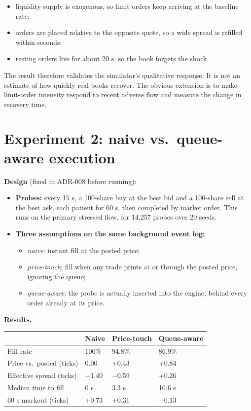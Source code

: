 \documentclass[11pt]{article}
\providecommand{\tightlist}{\setlength{\itemsep}{0pt}\setlength{\parskip}{0pt}}
\begin{document}
\begin{itemize}
\tightlist
\item
  liquidity supply is exogenous, so limit orders keep arriving at the
  baseline rate;
\item
  orders are placed relative to the opposite quote, so a wide spread is
  refilled within seconds;
\item
  resting orders live for about 20 s, so the book forgets the shock.
\end{itemize}

The result therefore validates the simulator's qualitative response. It
is not an estimate of how quickly real books recover. The obvious
extension is to make limit-order intensity respond to recent adverse
flow and measure the change in recovery time.

\hypertarget{experiment-2-naive-vs.-queue-aware-execution}{%
\section{Experiment 2: naive vs.~queue-aware execution}\label{experiment-2-naive-vs.-queue-aware-execution}}

\textbf{Design} (fixed in ADR-008 before running):

\begin{itemize}
\tightlist
\item
  \textbf{Probes:} every 15 s, a 100-share buy at the best bid and a 100-share
  sell at the best ask, each patient for 60 s, then completed by market
  order. This runs on the primary stressed flow, for 14,257 probes over
  20 seeds.
\item
  \textbf{Three assumptions on the same background event log:}

  \begin{itemize}
  \tightlist
  \item
    \emph{naive}: instant fill at the posted price;
  \item
    \emph{price-touch}: fill when any trade prints at or through the posted
    price, ignoring the queue;
  \item
    \emph{queue-aware}: the probe is actually inserted into the engine,
    behind every order already at its price.
  \end{itemize}
\end{itemize}

\textbf{Results.}

\begin{longtable}[]{@{}llll@{}}
\toprule\noalign{}
& Naive & Price-touch & Queue-aware \\
\midrule\noalign{}
\endhead
\bottomrule\noalign{}
\endlastfoot
Fill rate & 100\% & 94.8\% & 86.9\% \\
Price vs.~posted (ticks) & 0.00 & +0.43 & +0.84 \\
Effective spread (ticks) & −1.40 & −0.59 & +0.26 \\
Median time to fill & 0 s & 3.3 s & 10.6 s \\
60 s markout (ticks) & +0.73 & +0.31 & −0.13 \\
\end{longtable}
\end{document}
